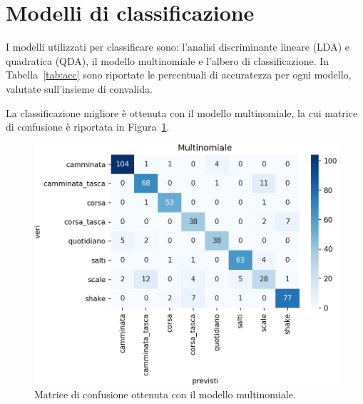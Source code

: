\documentclass[main.tex]{subfiles}
\begin{document}
\section{Modelli di classificazione}
I modelli utilizzati per classificare sono: l'analisi discriminante lineare (LDA) e quadratica (QDA), il modello multinomiale e l'albero di classificazione. In Tabella~\ref{tab:acc} sono riportate le percentuali di accuratezza per ogni modello, valutate sull'insieme di convalida.


La classificazione migliore è ottenuta con il modello multinomiale, la cui matrice di confusione è riportata in Figura~\ref{fig:mn}.
\begin{figure}[H]
	\centering
	\includegraphics[width=\confusion]{../../figure/confusionMatrix-Mn.png}
	\caption{Matrice di confusione ottenuta con il modello multinomiale.}
	\label{fig:mn}
\end{figure}
\end{document}

